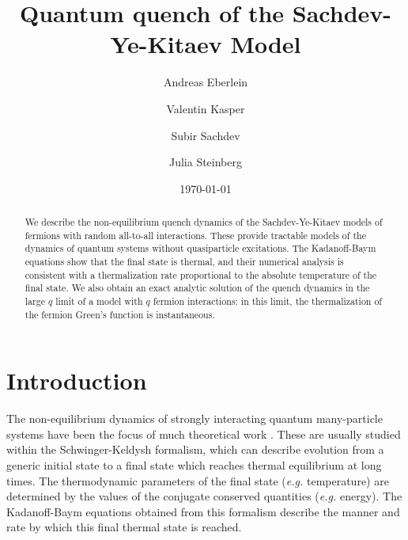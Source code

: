 \documentclass[prx,aps,onecolumn,amsfonts,showpacs,superscriptaddress,preprint,eqsecnum]
{revtex4-1}
\begin{document}
\title{Quantum quench of the Sachdev-Ye-Kitaev Model}

\author{Andreas Eberlein}

\author{Valentin Kasper}

\author{Subir Sachdev}

\author{Julia Steinberg}


\date{\today}

\begin{abstract}%
We describe the non-equilibrium quench dynamics of the Sachdev-Ye-Kitaev models of fermions with random all-to-all
interactions. These provide tractable models of the dynamics of quantum systems without quasiparticle excitations. The Kadanoff-Baym equations show that the final state is thermal, and their numerical analysis is consistent
with a thermalization rate proportional to the absolute
temperature of the final state. We also obtain an
exact analytic solution of the quench dynamics
in the large $q$ limit of a model with $q$ fermion interactions: in this limit, the thermalization of the fermion Green's function is instantaneous.
\end{abstract}



\maketitle

\section{Introduction}
\label{sec:intro}

The non-equilibrium dynamics of strongly interacting quantum many-particle systems
have been the focus of much theoretical work \cite{KamenevBook}. These are usually studied
within the Schwinger-Keldysh formalism, which can describe evolution from a generic initial
state to a final state which reaches thermal equilibrium at long times. The thermodynamic
parameters of the final state ({\em e.g.\/} temperature) 
are determined by the values of the  conjugate conserved quantities ({\em e.g.\/} energy). 
The Kadanoff-Baym equations obtained from this formalism describe the manner and rate by which this final thermal state is reached.
\end{document}
